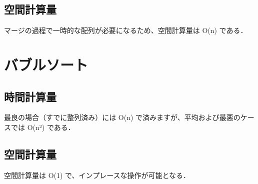 \documentclass[uplatex]{jsarticle}
\begin{document}
\subsection{空間計算量}

マージの過程で一時的な配列が必要になるため、空間計算量は O(n) である．

\section{バブルソート}
\subsection{時間計算量}

最良の場合（すでに整列済み）には O(n) で済みますが、平均および最悪のケースでは O(n²) である．

\subsection{空間計算量}

空間計算量は O(1) で、インプレースな操作が可能となる．
\end{document}
